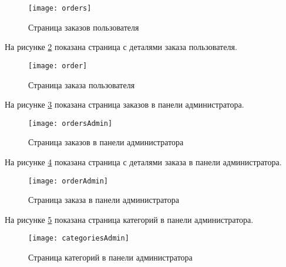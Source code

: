 \begin{figure}[H]
	\texttt{[image: orders]}
	\caption{Страница заказов пользователя}
	\label{orders:image}
\end{figure}

На рисунке \ref{order:image} показана страница с деталями заказа пользователя.

\begin{figure}[H]
	\texttt{[image: order]}
	\caption{Страница заказа пользователя}
	\label{order:image}
\end{figure}




На рисунке \ref{ordersAdmin:image} показана страница заказов в панели администратора.

\begin{figure}[H]
	\texttt{[image: ordersAdmin]}
	\caption{Страница заказов в панели администратора}
	\label{ordersAdmin:image}
\end{figure}

На рисунке \ref{orderAdmin:image} показана страница с деталями заказа в панели администратора.

\begin{figure}[H]
	\texttt{[image: orderAdmin]}
	\caption{Страница заказа в панели администратора}
	\label{orderAdmin:image}
\end{figure}

На рисунке \ref{categoriesAdmin:image} показана страница категорий в панели администратора.

\begin{figure}[H]
	\texttt{[image: categoriesAdmin]}
	\caption{Страница категорий в панели администратора}
	\label{categoriesAdmin:image}
\end{figure}

